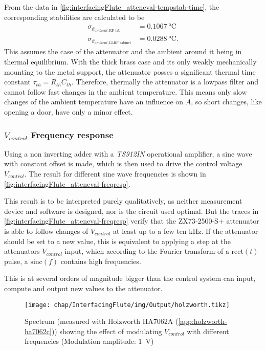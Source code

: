 From the data in \autoref{fig:interfacingFlute_atteneval-tempstab-time}, the corresponding stabilities are calculated to be
\begin{align}
\sigma_{\vartheta_{ambient, \text{RF lab}}}       &= \SI{0.1067}{\celsius}\\
\sigma_{\vartheta_{ambient, \text{LLRF cabinet}}} &= \SI{0.0288}{\celsius}.
\end{align}
This assumes the case of the attenuator and the ambient around it being in thermal equilibrium. With the thick brass case and its only weakly mechanically mounting to the metal support, the attenuator posses a significant thermal time constant $\tau_{th}=R_{th}C_{th}$. Therefore, thermally the attenuator is a lowpass filter and cannot follow fast changes in the ambient temperature.
This means only slow changes of the ambient temperature have an influence on $A$, so short changes, like opening a door, have only a minor effect.

\subsubsection{$V_{control}$ Frequency response}\label{sec:interfacingFlute_freqr}
Using a non inverting adder with a \textit{TS912IN} operational amplifier, a sine wave with constant offset is made, which is then used to drive the control voltage $V_{control}$. The result for different sine wave frequencies is shown in \autoref{fig:interfacingFlute_atteneval-freqresp}.

This result is to be interpreted purely qualitatively, as neither measurement device and software is designed, nor is the circuit used optimal.
But the traces in \autoref{fig:interfacingFlute_atteneval-freqresp} verify that the ZX73-2500-S+ attenuator is able to follow changes of $V_{control}$ at least up to a few ten \si{\kHz}. If the attenuator should be set to a new value, this is equivalent to applying a step at the attenuators $V_{control}$ input, which according to the Fourier transform of a $\text{rect}(t)$ pulse, a $\text{sinc}(f)$ contains high frequencies.

This is at several orders of magnitude bigger than the control system can input, compute and output new values to the attenuator.

\begin{figure}[tb]
	\centering
	\texttt{[image: chap/InterfacingFlute/img/Output/holzworth.tikz]}
	\caption{Spectrum (measured with Holzworth HA7062A (\autoref{app:holzworth-ha7062c})) showing the effect of modulating $V_{control}$ with different frequencies (Modulation amplitude: \SI{1}{\volt})}
	\label{fig:interfacingFlute_atteneval-freqresp}
\end{figure}

